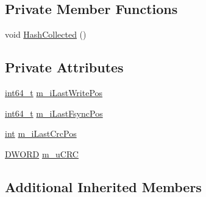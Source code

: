 \subsection*{Private Member Functions}
\begin{DoxyCompactItemize}
\item 
void \hyperlink{classBinlogWriter__c_a2da170298d3fa4bfb21b4d48386a8a4c}{Hash\-Collected} ()
\end{DoxyCompactItemize}
\subsection*{Private Attributes}
\begin{DoxyCompactItemize}
\item 
\hyperlink{sphinxstd_8h_a996e72f71b11a5bb8b3b7b6936b1516d}{int64\-\_\-t} \hyperlink{classBinlogWriter__c_a53b7d792d027b67edaeeaf56b505d3cf}{m\-\_\-i\-Last\-Write\-Pos}
\item 
\hyperlink{sphinxstd_8h_a996e72f71b11a5bb8b3b7b6936b1516d}{int64\-\_\-t} \hyperlink{classBinlogWriter__c_a75189762b43b11c78642317aee026ee5}{m\-\_\-i\-Last\-Fsync\-Pos}
\item 
\hyperlink{sphinxexpr_8cpp_a4a26e8f9cb8b736e0c4cbf4d16de985e}{int} \hyperlink{classBinlogWriter__c_a687fff645ffca4229438a9ea6c95eeae}{m\-\_\-i\-Last\-Crc\-Pos}
\item 
\hyperlink{sphinxstd_8h_a798af1e30bc65f319c1a246cecf59e39}{D\-W\-O\-R\-D} \hyperlink{classBinlogWriter__c_a3ec5ac39e5834fcc146241a22d8474d4}{m\-\_\-u\-C\-R\-C}
\end{DoxyCompactItemize}
\subsection*{Additional Inherited Members}


